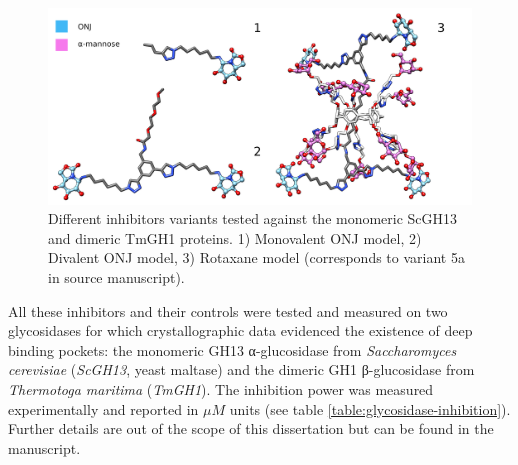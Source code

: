 \begin{figure}[hbtp] %
	\begin{Center}
		\includegraphics[width=\textwidth]{./figures/06/glyco-inhibitors-chimera-legend.png}
	\end{Center}
	\cprotect\caption[Tested inhibitors against ScGH13 and TmGH1]{Different inhibitors variants tested against the monomeric ScGH13 and dimeric TmGH1 proteins. 1) Monovalent ONJ model, 2) Divalent ONJ model, 3) Rotaxane model (corresponds to variant 5a in source manuscript\cite{rotaxane}).}
	\label{fig:rotaxane-compounds}
\end{figure}



All these inhibitors and their controls were tested and measured on two glycosidases for which crystallographic data evidenced the existence of deep binding pockets: the monomeric GH13 α-glucosidase from \textit{Saccharomyces cerevisiae} (\textit{ScGH13}, yeast maltase) and the dimeric GH1 β-glucosidase from \textit{Thermotoga maritima} (\textit{TmGH1}). The inhibition power was measured experimentally and reported in $ \mu M $ units (see table \ref{table:glycosidase-inhibition}). Further details are out of the scope of this dissertation but can be found in the manuscript.\cite{rotaxane}




